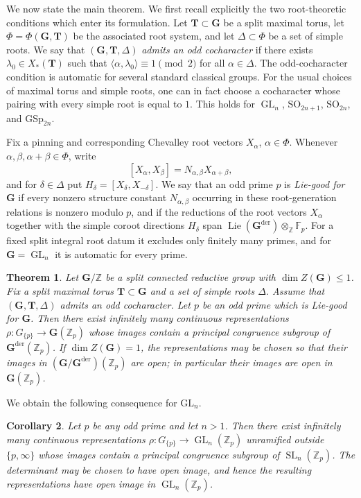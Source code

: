\documentclass[11pt]{amsart}
\numberwithin{equation}{section}
\newcommand{\Z}{\mathbb Z}
\newcommand{\Fp}{\mathbb F_p}
\newcommand{\Zp}{\mathbb Z_p}
\newcommand{\GG}{\mathbf G}
\newcommand{\TT}{\mathbf T}
\newcommand{\Gder}{\mathbf G^{\mathrm{der}}}
\newcommand{\Lie}{\operatorname{Lie}}
\newcommand{\SL}{\operatorname{SL}}
\newcommand{\GL}{\operatorname{GL}}
\newtheorem{theorem}{Theorem}[section]
\newtheorem{corollary}[theorem]{Corollary}
\theoremstyle{definition}
\begin{document}
\par We now state the main theorem. We first recall explicitly the two
root-theoretic conditions which enter its formulation. Let
$\TT\subset\GG$ be a split maximal torus, let
$\Phi=\Phi(\GG,\TT)$ be the associated root system, and let
$\Delta\subset\Phi$ be a set of simple roots. We say that
$(\GG,\TT,\Delta)$ \emph{admits an odd cocharacter} if there exists
$\lambda_0\in X_*(\TT)$ such that $\langle\alpha,\lambda_0\rangle
        \equiv1\pmod 2$ for all $
        \alpha\in\Delta$. The odd-cocharacter condition is automatic for several standard
classical groups. For the usual choices of maximal torus and simple
roots, one can in fact choose a cocharacter whose pairing with every
simple root is equal to $1$.  This holds for $\GL_n$,
$\mathrm{SO}_{2n+1}$, $\mathrm{SO}_{2n}$, and $\mathrm{GSp}_{2n}$.
\par Fix a pinning and corresponding Chevalley root vectors
$X_\alpha$, $\alpha\in\Phi$. Whenever
$\alpha,\beta,\alpha+\beta\in\Phi$, write
\[
        [X_\alpha,X_\beta]
        =
        N_{\alpha,\beta}X_{\alpha+\beta},
\]
and for $\delta\in\Delta$ put
$H_\delta=[X_\delta,X_{-\delta}]$. We say that an odd prime $p$ is
\emph{Lie-good for $\GG$} if every nonzero structure constant
$N_{\alpha,\beta}$ occurring in these root-generation relations is
nonzero modulo $p$, and if the reductions of the root vectors
$X_\alpha$ together with the simple coroot directions $H_\delta$ span $\Lie(\Gder)\otimes_{\Z}\Fp$.
For a fixed split integral
root datum it excludes only finitely many primes, and for
$\GG=\GL_n$ it is automatic for every prime.


\begin{theorem}\label{thm:main}
Let $\GG/\Z$ be a split connected reductive group with
$\dim Z(\GG)\leq1$. Fix a split maximal torus $\TT\subset\GG$ and a
set of simple roots $\Delta$. Assume that $(\GG,\TT,\Delta)$ admits an
odd cocharacter. Let $p$ be an odd prime which is Lie-good for $\GG$.
Then there exist infinitely many continuous representations $\rho:G_{\{p\}}\longrightarrow\GG(\Zp)$
whose images contain a principal congruence subgroup of
$\Gder(\Zp)$. If $\dim Z(\GG)=1$, the representations may be chosen so
that their images in $(\GG/\Gder)(\Zp)$ are open; in particular their
images are open in $\GG(\Zp)$.
\end{theorem}

We obtain the following
consequence for $\mathrm{GL}_n$.

\begin{corollary}\label{cor:GLn}
Let $p$ be any odd prime and let $n>1$. Then there exist infinitely
many continuous representations $\rho:G_{\{p\}}\longrightarrow\GL_n(\Zp)$
unramified outside $\{p,\infty\}$ whose images contain a principal
congruence subgroup of $\SL_n(\Zp)$. The determinant may be chosen to
have open image, and hence the resulting representations have open
image in $\GL_n(\Zp)$.
\end{corollary}
\end{document}
